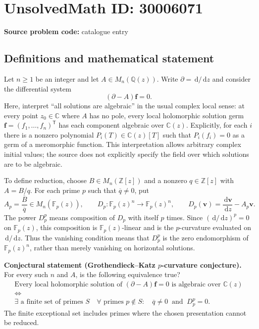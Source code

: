 \documentclass[11pt]{article}
\newcommand{\Z}{\mathbb{Z}}
\newcommand{\Q}{\mathbb{Q}}
\newcommand{\C}{\mathbb{C}}
\newcommand{\F}{\mathbb{F}}
\newcommand{\dd}{\,\mathrm{d}}
\begin{document}
\section*{UnsolvedMath ID: 30006071}
\textbf{Source problem code:} catalogue entry
\subsection{Definitions and mathematical statement}
Let \(n\geq 1\) be an integer and let \(A\in M_n(\Q(z))\). Write \(\partial=\dd/\dd z\) and consider the differential system
\[
(\partial-A)\mathbf f=0.
\]
Here, interpret ``all solutions are algebraic'' in the usual complex local sense: at every point \(z_0\in\C\) where \(A\) has no pole, every local holomorphic solution germ \(\mathbf f=(f_1,\ldots,f_n)^\mathsf T\) has each component algebraic over \(\C(z)\). Explicitly, for each \(i\) there is a nonzero polynomial \(P_i(T)\in\C(z)[T]\) such that \(P_i(f_i)=0\) as a germ of a meromorphic function. This interpretation allows arbitrary complex initial values; the source does not explicitly specify the field over which solutions are to be algebraic.

To define reduction, choose \(B\in M_n(\Z[z])\) and a nonzero \(q\in\Z[z]\) with \(A=B/q\). For each prime \(p\) such that \(\overline q\neq 0\), put
\[
A_p=\frac{\overline B}{\overline q}\in M_n(\F_p(z)),\qquad
D_p:\F_p(z)^n\longrightarrow\F_p(z)^n,\qquad
D_p(\mathbf v)=\frac{\dd\mathbf v}{\dd z}-A_p\mathbf v.
\]
The power \(D_p^p\) means composition of \(D_p\) with itself \(p\) times. Since \((\dd/\dd z)^p=0\) on \(\F_p(z)\), this composition is \(\F_p(z)\)-linear and is the \(p\)-curvature evaluated on \(\dd/\dd z\). Thus the vanishing condition means that \(D_p^p\) is the zero endomorphism of \(\F_p(z)^n\), rather than merely vanishing on horizontal solutions.

\textbf{Conjectural statement (Grothendieck--Katz \(p\)-curvature conjecture).} For every such \(n\) and \(A\), is the following equivalence true?
\[
\begin{gathered}
\text{Every local holomorphic solution of }(\partial-A)\mathbf f=0
\text{ is algebraic over }\C(z)
\\[2pt]
\Longleftrightarrow
\\[2pt]
\exists\text{ a finite set of primes }S\quad
\forall\text{ primes }p\notin S:\quad
\overline q\neq 0\ \text{ and }\ D_p^p=0.
\end{gathered}
\]
The finite exceptional set includes primes where the chosen presentation cannot be reduced.
\end{document}

